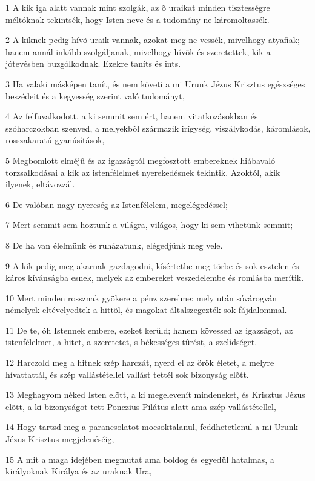 \par 1 A kik iga alatt vannak mint szolgák, az õ uraikat minden tisztességre méltóknak tekintsék, hogy Isten neve és a tudomány ne káromoltassék.
\par 2 A kiknek pedig hívõ uraik vannak, azokat meg ne vessék, mivelhogy atyafiak; hanem annál inkább szolgáljanak, mivelhogy hívõk és szeretettek, kik a jótevésben buzgólkodnak. Ezekre taníts és ints.
\par 3 Ha valaki másképen tanít, és nem követi a mi Urunk Jézus Krisztus egészséges beszédeit és a kegyesség szerint való tudományt,
\par 4 Az felfuvalkodott, a ki semmit sem ért, hanem vitatkozásokban és szóharczokban szenved, a melyekbõl származik irígység, viszálykodás, káromlások, rosszakaratú gyanúsítások,
\par 5 Megbomlott elméjû és az igazságtól megfosztott embereknek hiábavaló torzsalkodásai a kik az istenfélelmet nyerekedésnek tekintik. Azoktól, akik ilyenek, eltávozzál.
\par 6 De valóban nagy nyereség az Istenfélelem, megelégedéssel;
\par 7 Mert semmit sem hoztunk a világra, világos, hogy ki sem vihetünk semmit;
\par 8 De ha van élelmünk és ruházatunk, elégedjünk meg vele.
\par 9 A kik pedig meg akarnak gazdagodni, kísértetbe meg tõrbe és sok esztelen és káros kívánságba esnek, melyek az embereket veszedelembe és romlásba merítik.
\par 10 Mert minden rossznak gyökere a pénz szerelme: mely után sóvárogván némelyek eltévelyedtek a hittõl, és magokat általszegezték sok fájdalommal.
\par 11 De te, óh Istennek embere, ezeket kerüld; hanem kövessed az igazságot, az istenfélelmet, a hitet, a szeretetet, s békességes tûrést, a szelídséget.
\par 12 Harczold meg a hitnek szép harczát, nyerd el az örök életet, a melyre hívattattál, és szép vallástétellel vallást tettél sok bizonyság elõtt.
\par 13 Meghagyom néked Isten elõtt, a ki megelevenít mindeneket, és Krisztus Jézus elõtt, a ki bizonyságot tett Ponczius Pilátus alatt ama szép vallástétellel,
\par 14 Hogy tartsd meg a parancsolatot mocsoktalanul, feddhetetlenül a mi Urunk Jézus Krisztus megjelenéséig,
\par 15 A mit a maga idejében megmutat ama boldog és egyedül hatalmas, a királyoknak Királya és az uraknak Ura,
